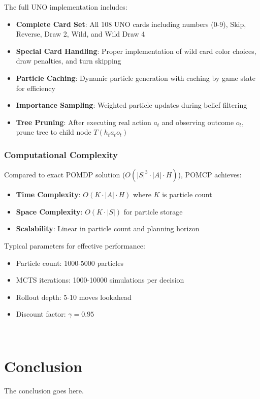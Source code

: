 \documentclass[journal,transmag]{IEEEtran}
\begin{document}
The full UNO implementation includes:
\begin{itemize}
    \item \textbf{Complete Card Set}: All 108 UNO cards including numbers (0-9), Skip, Reverse, Draw 2, Wild, and Wild Draw 4
    \item \textbf{Special Card Handling}: Proper implementation of wild card color choices, draw penalties, and turn skipping
    \item \textbf{Particle Caching}: Dynamic particle generation with caching by game state for efficiency
    \item \textbf{Importance Sampling}: Weighted particle updates during belief filtering
    \item \textbf{Tree Pruning}: After executing real action $a_t$ and observing outcome $o_t$, prune tree to child node $T(h_t a_t o_t)$
\end{itemize}

\subsubsection{Computational Complexity}

Compared to exact POMDP solution ($O(|S|^3 \cdot |A| \cdot H)$), POMCP achieves:
\begin{itemize}
    \item \textbf{Time Complexity}: $O(K \cdot |A| \cdot H)$ where $K$ is particle count
    \item \textbf{Space Complexity}: $O(K \cdot |S|)$ for particle storage
    \item \textbf{Scalability}: Linear in particle count and planning horizon
\end{itemize}

Typical parameters for effective performance:
\begin{itemize}
    \item Particle count: 1000-5000 particles
    \item MCTS iterations: 1000-10000 simulations per decision
    \item Rollout depth: 5-10 moves lookahead
    \item Discount factor: $\gamma = 0.95$
\end{itemize}

\\
\section{Conclusion}

The conclusion goes here.


\end{document}
